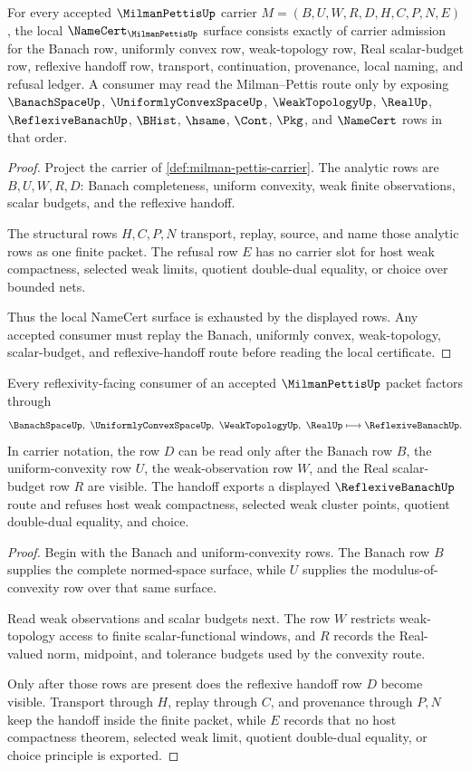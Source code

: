 \begin{theorem}
\label{thm:milman-pettis-namecert-obligations}
For every accepted $\MilmanPettisUp$ carrier $M=(B,U,W,R,D,H,C,P,N,E)$, the local $\NameCert_{\MilmanPettisUp}$ surface consists exactly of carrier admission for the Banach row, uniformly convex row, weak-topology row, Real scalar-budget row, reflexive handoff row, transport, continuation, provenance, local naming, and refusal ledger. A consumer may read the Milman--Pettis route only by exposing $\BanachSpaceUp$, $\UniformlyConvexSpaceUp$, $\WeakTopologyUp$, $\RealUp$, $\ReflexiveBanachUp$, $\BHist$, $\hsame$, $\Cont$, $\Pkg$, and $\NameCert$ rows in that order.
\end{theorem}
\begin{proof}
Project the carrier of \autoref{def:milman-pettis-carrier}. The analytic rows are $B,U,W,R,D$: Banach completeness, uniform convexity, weak finite observations, scalar budgets, and the reflexive handoff.

The structural rows $H,C,P,N$ transport, replay, source, and name those analytic rows as one finite packet. The refusal row $E$ has no carrier slot for host weak compactness, selected weak limits, quotient double-dual equality, or choice over bounded nets.

Thus the local NameCert surface is exhausted by the displayed rows. Any accepted consumer must replay the Banach, uniformly convex, weak-topology, scalar-budget, and reflexive-handoff route before reading the local certificate.
\end{proof}

\begin{theorem}
\label{thm:milman-pettis-reflexive-handoff}
Every reflexivity-facing consumer of an accepted $\MilmanPettisUp$ packet factors through
$$
\BanachSpaceUp,\ \UniformlyConvexSpaceUp,\ \WeakTopologyUp,\ \RealUp
\longmapsto
\ReflexiveBanachUp .
$$
In carrier notation, the row $D$ can be read only after the Banach row $B$, the uniform-convexity row $U$, the weak-observation row $W$, and the Real scalar-budget row $R$ are visible. The handoff exports a displayed $\ReflexiveBanachUp$ route and refuses host weak compactness, selected weak cluster points, quotient double-dual equality, and choice.
\end{theorem}
\begin{proof}
Begin with the Banach and uniform-convexity rows. The Banach row $B$ supplies the complete normed-space surface, while $U$ supplies the modulus-of-convexity row over that same surface.

Read weak observations and scalar budgets next. The row $W$ restricts weak-topology access to finite scalar-functional windows, and $R$ records the Real-valued norm, midpoint, and tolerance budgets used by the convexity route.

Only after those rows are present does the reflexive handoff row $D$ become visible. Transport through $H$, replay through $C$, and provenance through $P,N$ keep the handoff inside the finite packet, while $E$ records that no host compactness theorem, selected weak limit, quotient double-dual equality, or choice principle is exported.
\end{proof}

